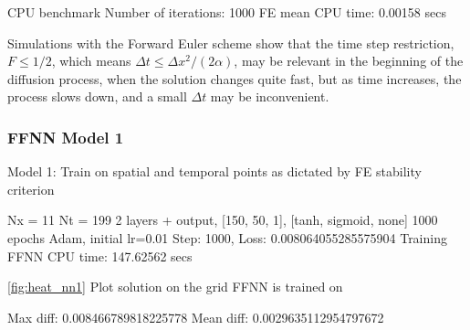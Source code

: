 CPU benchmark
Number of iterations: 1000
FE mean CPU time: 0.00158 secs

Simulations with the Forward Euler scheme show that the time step restriction, $F \leq 1/2$, which means $\Delta t \leq \Delta x^2 / (2\alpha)$, may be relevant in the beginning of the diffusion process, when the solution changes quite fast, but as time increases, the process slows down, and a small $\Delta t$ may be inconvenient.

\subsubsection{FFNN Model 1}

Model 1: Train on spatial and temporal points as dictated by FE stability criterion

Nx = 11
Nt = 199
2 layers + output, [150, 50, 1], [tanh, sigmoid, none] 
1000 epochs
Adam, initial lr=0.01
Step: 1000, Loss: 0.008064055285575904
Training FFNN CPU time: 147.62562 secs

\autoref{fig:heat_nn1} Plot solution on the grid FFNN is trained on

Max diff: 0.008466789818225778
Mean diff: 0.0029635112954797672

